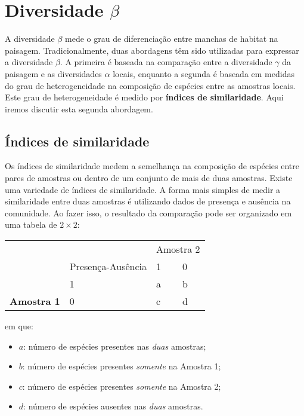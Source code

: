 \documentclass[
]{book}
\begin{document}
\hypertarget{diversidade-beta}{%
\section{\texorpdfstring{Diversidade \(\beta\)}{Diversidade \textbackslash beta}}\label{diversidade-beta}}

A diversidade \(\beta\) mede o grau de diferenciação entre manchas de habitat na paisagem. Tradicionalmente, duas abordagens têm sido utilizadas para expressar a diversidade \(\beta\). A primeira é baseada na comparação entre a diversidade \(\gamma\) da paisagem e as diversidades \(\alpha\) locais, enquanto a segunda é baseada em medidas do grau de heterogeneidade na composição de espécies entre as amostras locais. Este grau de heterogeneidade é medido por \textbf{índices de similaridade}. Aqui iremos discutir esta segunda abordagem.

\hypertarget{uxedndices-de-similaridade}{%
\subsection{Índices de similaridade}\label{uxedndices-de-similaridade}}

Os índices de similaridade medem a semelhança na composição de espécies entre pares de amostras ou dentro de um conjunto de mais de duas amostras. Existe uma variedade de índices de similaridade. A forma mais simples de medir a similaridade entre duas amostras é utilizando dados de presença e ausência na comunidade. Ao fazer isso, o resultado da comparação pode ser organizado em uma tabela de \(2 \times 2\):

\begin{table}
\centering
\begin{tabular}{>{}l|l|l|l}
\hline
\multicolumn{1}{c|}{} & \multicolumn{1}{c|}{} & \multicolumn{2}{c}{Amostra 2} \\
\cline{3-4}
  & Presença-Ausência & 1 & 0\\
\hline
 & 1 & a & b\\
\cline{2-4}
\multirow{-2}{*}{\raggedright\arraybackslash \textbf{Amostra 1}} & 0 & c & d\\
\hline
\end{tabular}
\end{table}

em que:

\begin{itemize}
\item
  \emph{\(a\)}: número de espécies presentes nas \emph{duas} amostras;
\item
  \emph{\(b\)}: número de espécies presentes \emph{somente} na Amostra 1;
\item
  \emph{\(c\)}: número de espécies presentes \emph{somente} na Amostra 2;
\item
  \emph{\(d\)}: número de espécies ausentes nas \emph{duas} amostras.
\end{itemize}
\end{document}
